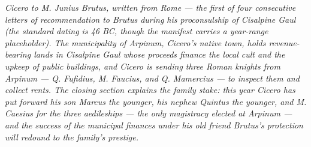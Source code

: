 
\textit{Cicero to M. Junius Brutus, written from Rome --- the first of
four consecutive letters of recommendation to Brutus during his
proconsulship of Cisalpine Gaul (the standard dating is 46 BC,
though the manifest carries a year-range placeholder). The
municipality of Arpinum, Cicero's native town, holds revenue-bearing
lands in Cisalpine Gaul whose proceeds finance the local cult and
the upkeep of public buildings, and Cicero is sending three Roman
knights from Arpinum --- Q. Fufidius, M. Faucius, and Q. Mamercius
--- to inspect them and collect rents. The closing section explains
the family stake: this year Cicero has put forward his son Marcus
the younger, his nephew Quintus the younger, and M. Caesius for
the three aedileships --- the only magistracy elected at Arpinum
--- and the success of the municipal finances under his old friend
Brutus's protection will redound to the family's prestige.}
